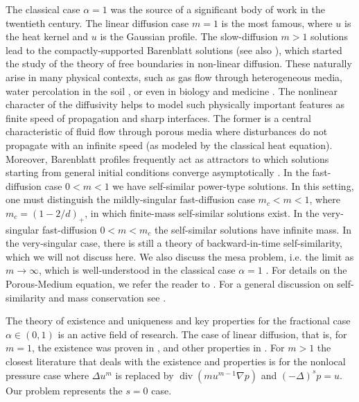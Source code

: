 \documentclass[a4paper]{article}
\theoremstyle{definition}
\begin{document}
The classical case $\alpha = 1$ was the source of a significant body of work in the twentieth century. The linear diffusion case $m = 1$ is the most famous, where $u$ is the heat kernel and $u$ is the Gaussian profile. The slow-diffusion $m > 1$ solutions lead to the compactly-supported Barenblatt solutions \cite{MR1426127} (see also \cite{MR46217,zel1950towards}), which started the study of the theory of free boundaries in non-linear diffusion. 
These naturally arise in many physical contexts, such as gas flow through heterogeneous media, water percolation in the soil \cite{bear2013dynamics}, or even in biology \cite{vafai2010porous} and medicine \cite{lavrova2021barenblatt}. The nonlinear character of the diffusivity helps to model such physically important features as finite speed of propagation and sharp interfaces. The former is a central characteristic of fluid flow through porous media where disturbances do not propagate with an infinite speed (as modeled by the classical heat equation). Moreover, Barenblatt profiles frequently act as attractors to which solutions starting from general initial conditions converge asymptotically \cite{vazquez2014barenblatt}. \normalcolor In the fast-diffusion case $0 < m < 1$ we have self-similar power-type solutions. In this setting, one must distinguish the mildly-singular fast-diffusion case $m_c < m < 1$, where $m_c = (1 - 2/d)_+$, in which finite-mass self-similar solutions exist. In the very-singular fast-diffusion $0 < m < m_c$ the self-similar solutions have infinite mass. In the very-singular case, there is still a theory of backward-in-time self-similarity, which we will not discuss here. 
We also discuss the mesa problem, i.e. the limit as $m\to \infty$, which is well-understood in the classical case $\alpha = 1$ \cite{MR983523,MR883709}.
For details on the Porous-Medium equation, we refer the reader to \cite{Vazquez2006,Vazquez2006a}.
For a general discussion on self-similarity and mass conservation see \cite{vazquez2025surveymassconservationselfsimilarity}.

\medskip

The theory of existence and uniqueness and key properties for the fractional case $\alpha \in (0,1)$ is an active field of research.
The case of linear diffusion, that is, for $m = 1$, the existence was proven in \cite{Zacher2009}, and other properties in \cite{vergara2015,dier2020,cortazarHeatEquationMemory2021}. 
For $m > 1$ the closest literature that deals with the existence and properties is
\cite{djidaNonlocalTimeporousMedium2019,DjidaNietoArea2019}
for the nonlocal pressure case where $\Delta u^m$ is replaced by $\operatorname{div}(m u^{m-1} \nabla p)$ and $(-\Delta)^s p = u$. Our problem represents the $s = 0$ case. 
\end{document}
